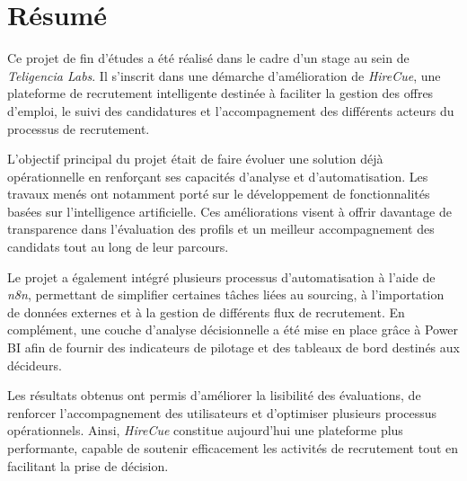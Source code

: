 \chapter*{Résumé}

Ce projet de fin d’études a été réalisé dans le cadre d’un stage au sein de \textit{Teligencia Labs}. Il s’inscrit dans une démarche d’amélioration de \textit{HireCue}, une plateforme de recrutement intelligente destinée à faciliter la gestion des offres d’emploi, le suivi des candidatures et l’accompagnement des différents acteurs du processus de recrutement.

L’objectif principal du projet était de faire évoluer une solution déjà opérationnelle en renforçant ses capacités d’analyse et d’automatisation. Les travaux menés ont notamment porté sur le développement de fonctionnalités basées sur l’intelligence artificielle. Ces améliorations visent à offrir davantage de transparence dans l’évaluation des profils et un meilleur accompagnement des candidats tout au long de leur parcours.

Le projet a également intégré plusieurs processus d’automatisation à l’aide de \textit{n8n}, permettant de simplifier certaines tâches liées au sourcing, à l’importation de données externes et à la gestion de différents flux de recrutement. En complément, une couche d’analyse décisionnelle a été mise en place grâce à Power BI afin de fournir des indicateurs de pilotage et des tableaux de bord destinés aux décideurs.

Les résultats obtenus ont permis d’améliorer la lisibilité des évaluations, de renforcer l’accompagnement des utilisateurs et d’optimiser plusieurs processus opérationnels. Ainsi, \textit{HireCue} constitue aujourd’hui une plateforme plus performante, capable de soutenir efficacement les activités de recrutement tout en facilitant la prise de décision.